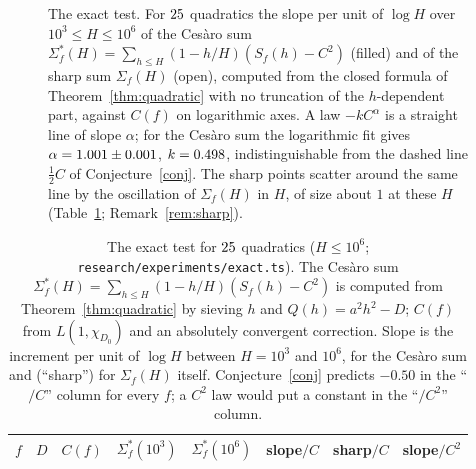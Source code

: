 \documentclass[11pt,a4paper]{article}
\theoremstyle{remark}\newtheorem{remark}[theorem]{Remark}
\begin{document}
\begin{figure}[t]
\centering
{}
\caption{The exact test. For $25$ quadratics the slope per unit of $\log H$ over $10^3\le H\le10^6$ of the
Ces\`aro sum $\Sigma^\ast_f(H)=\sum_{h\le H}(1-h/H)(S_f(h)-C^2)$ (filled) and of the sharp sum $\Sigma_f(H)$ (open),
computed from the closed formula of Theorem~\ref{thm:quadratic} with no truncation of the $h$-dependent part,
against $C(f)$ on logarithmic axes. A law $-kC^\alpha$ is a straight line of slope $\alpha$; for the Ces\`aro sum
the logarithmic fit gives $\alpha=1.001\pm0.001$, $k=0.498$, indistinguishable from the dashed line
$\tfrac12C$ of Conjecture~\ref{conj}. The sharp points scatter around the same line by the oscillation
of $\Sigma_f(H)$ in $H$, of size about $1$ at these $H$ (Table~\ref{tab:exact}; Remark~\ref{rem:sharp}).}\label{fig:exact}
\end{figure}

\begin{table}[htbp]
\centering\footnotesize\setlength{\tabcolsep}{5pt}
\caption{The exact test for $25$ quadratics ($H\le10^6$; \texttt{research/experiments/exact.ts}). The Ces\`aro
sum $\Sigma^\ast_f(H)=\sum_{h\le H}(1-h/H)(S_f(h)-C^2)$ is computed from Theorem~\ref{thm:quadratic} by sieving $h$ and
$Q(h)=a^2h^2-D$; $C(f)$ from $L(1,\chi_{D_0})$ and an absolutely convergent correction. Slope is the increment per
unit of $\log H$ between $H=10^3$ and $10^6$, for the Ces\`aro sum and (``sharp'') for $\Sigma_f(H)$ itself.
Conjecture~\ref{conj} predicts $-0.50$ in the ``$/C$'' column for every $f$; a $C^2$ law would put a constant in
the ``$/C^2$'' column.}\label{tab:exact}
\begin{tabular}{lrrrrrrr}
\toprule
$f$ & $D$ & $C(f)$ & $\Sigma^\ast_f(10^3)$ & $\Sigma^\ast_f(10^6)$ & slope$/C$ & sharp$/C$ & slope$/C^2$\\
\midrule

\end{tabular}
\end{table}
\end{document}
